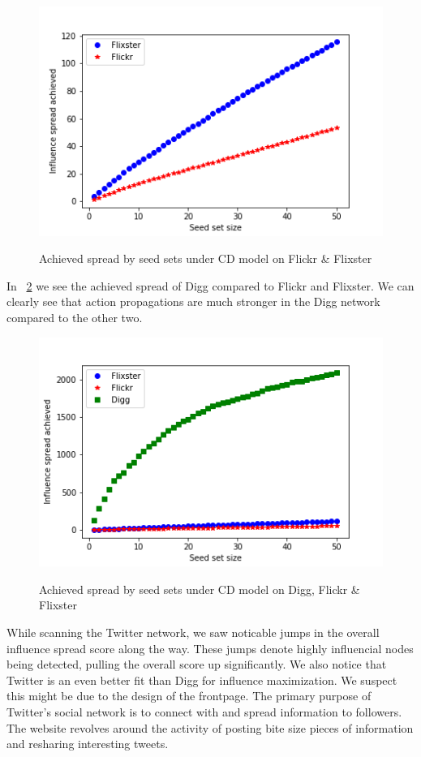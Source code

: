 \documentclass{acm_proc_article-sp}
\begin{document}
\begin{figure}[h]
	\includegraphics[width=\linewidth]{spread2.png}
	\centering
	\label{spread2}
	\caption{Achieved spread by seed sets under CD model on Flickr \& Flixster}
\end{figure}

In ~\ref{spread3} we see the achieved spread of Digg compared to Flickr and Flixster. We can clearly see that action propagations are much stronger in the Digg network compared to the other two.

\begin{figure}[h]
	\includegraphics[width=\linewidth]{spread3.png}
	\centering
	\label{spread3}
    \caption{Achieved spread by seed sets under CD model on Digg, Flickr \& Flixster}
\end{figure}

While scanning the Twitter network, we saw noticable jumps in the overall influence spread score along the way. These jumps denote highly influencial nodes being detected, pulling the overall score up significantly. We also notice that Twitter is an even better fit than Digg for influence maximization. We suspect this might be due to the design of the frontpage. The primary purpose of Twitter's social network is to connect with and spread information to followers. The website revolves around the activity of posting bite size pieces of information and resharing interesting tweets.
\end{document}
